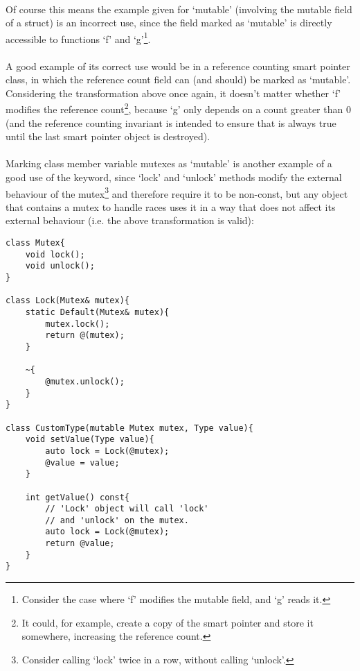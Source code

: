 \documentclass[12pt,twoside,notitlepage]{report}
\begin{document}
\paragraph{}
Of course this means the example given for `mutable' (involving the mutable field of a struct) is an incorrect use, since the field marked as `mutable' is directly accessible to functions `f' and `g'\footnote{Consider the case where `f' modifies the mutable field, and `g' reads it.}.

\paragraph{}
A good example of its correct use would be in a reference counting smart pointer class, in which the reference count field can (and should) be marked as `mutable'. Considering the transformation above once again, it doesn't matter whether `f' modifies the reference count\footnote{It could, for example, create a copy of the smart pointer and store it somewhere, increasing the reference count.}, because `g' only depends on a count greater than 0 (and the reference counting invariant is intended to ensure that is always true until the last smart pointer object is destroyed).

\paragraph{}
Marking class member variable mutexes as `mutable' is another example of a good use of the keyword, since `lock' and `unlock' methods modify the external behaviour of the mutex\footnote{Consider calling `lock' twice in a row, without calling `unlock'.} and therefore require it to be non-const, but any object that contains a mutex to handle races uses it in a way that does not affect its external behaviour (i.e. the above transformation is valid):

\begin{lstlisting}
class Mutex{
	void lock();
	void unlock();
}

class Lock(Mutex& mutex){
	static Default(Mutex& mutex){
		mutex.lock();
		return @(mutex);
	}
	
	~{
		@mutex.unlock();
	}
}

class CustomType(mutable Mutex mutex, Type value){
	void setValue(Type value){
		auto lock = Lock(@mutex);
		@value = value;
	}

	int getValue() const{
		// 'Lock' object will call 'lock'
		// and 'unlock' on the mutex.
		auto lock = Lock(@mutex);
		return @value;
	}
}
\end{lstlisting}
\end{document}
